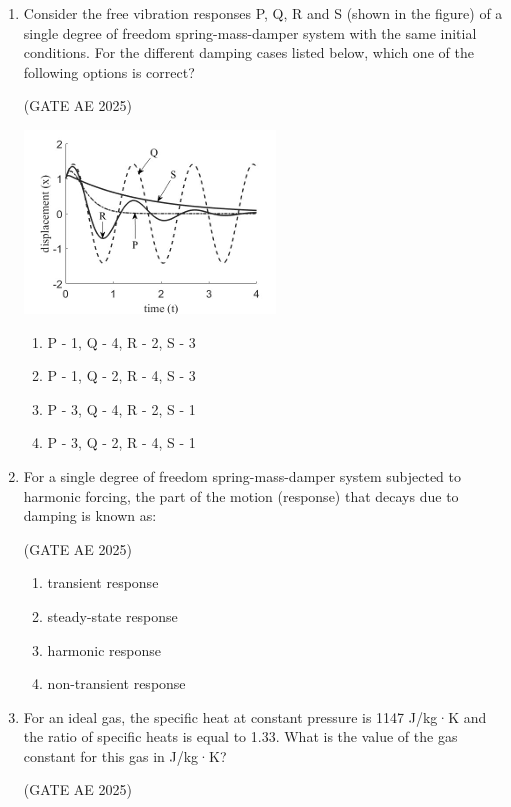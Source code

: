 \documentclass[journal,12pt,onecolumn]{IEEEtran}
\theoremstyle{remark}
\begin{document}
\begin{flushleft}
\begin{enumerate}
\item Consider the free vibration responses P, Q, R and S (shown in the figure) of a single degree of freedom spring-mass-damper system with the same initial conditions. For the different damping cases listed below, which one of the following options is correct? 

\hfill (GATE AE 2025)

\begin{center}
\includegraphics[width=0.5\columnwidth]{figs/xt.png}
\end{center}
\begin{enumerate}
    \item P - 1, Q - 4, R - 2, S - 3
    \item P - 1, Q - 2, R - 4, S - 3
    \item P - 3, Q - 4, R - 2, S - 1
    \item P - 3, Q - 2, R - 4, S - 1
\end{enumerate}

\item For a single degree of freedom spring-mass-damper system subjected to harmonic forcing, the part of the motion (response) that decays due to damping is known as:

\hfill (GATE AE 2025)

 \begin{enumerate}
    \item transient response
    \item steady-state response
    \item harmonic response
    \item non-transient response
 \end{enumerate}   


\item For an ideal gas, the specific heat at constant pressure is 1147 J/kg·K and the ratio of specific heats is equal to 1.33. What is the value of the gas constant for this gas in J/kg·K? 

\hfill (GATE AE 2025)


\end{enumerate}
\end{flushleft}
\end{document}
